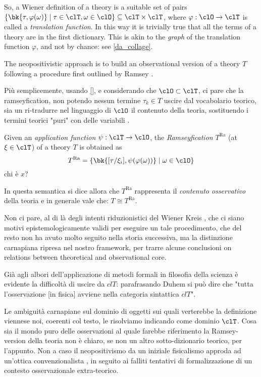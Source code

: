 So, a Wiener definition of a theory is a suitable set of pairs $\{\bk{\tau,\varphi(\omega)} \mid \tau\in\clT, \omega \in\clO\}\subseteq \clT\times\clT$, where $\varphi: \clO \to \clT$ is called a \emph{translation function}. In this way it is trivially true that all the terms of a theory are in the first dictionary. This is akin to the \emph{graph} of the translation function $\varphi$, and not by chance: see \autoref{da_collage}.

The neopositivistic approach is to build an observational version of a theory $T$ following a procedure first outlined by Ramsey \cite{?}.

Più semplicemente, usando \autoref{}, e considerando che $\clO \subset \clT$, ci pare che la ramseyfication, non potendo nessun termine $\tau_k \in T$ uscire dal vocabolario teorico, sia un ri-tradurre nel linguaggio di $\clO$ il contenuto della teoria, sostituendo i termini teorici "puri" con delle variabili \cite{?}.
\begin{definition}
	Given an \emph{application function} $\psi: \clT \to \clO$, the \emph{Ramseyfication} $T^\text{Ra}$ (at $\xi\in\clT$) of a theory $T$ is obtained as  
	\[ 
		T^\text{Ra} = \{\bk{[\tau/\xi_i], \psi(\varphi (\omega))} \mid \omega\in\clO\} 
	\] {\color{red} chi è $x$?}
\end{definition}
In questa semantica si dice allora che $T^\text{Ra}$ rappresenta il \emph{contenuto osservativo} della teoria e in generale vale che: $T \cong T^\text{Ra}$. 



Non ci pare, al di là degli intenti riduzionistici del Wiener Kreis \cite{Weinb}, che ci siano motivi epistemologicamente validi per eseguire un tale procedimento, che del resto non ha avuto molto seguito nella storia successiva, ma la distinzione carnapiana ripresa nel nostro framework, per trarre alcune conclusioni on relations between theoretical and observational core.

Già agli albori dell'applicazione di metodi formali in filosofia della scienza è evidente la difficoltà di uscire da $clT$: parafrasando Duhem si può dire che "tutta l'osservazione [in fisica] avviene nella categoria sintattica $clT$". 

Le ambiguità carnapiane sul dominio di oggetti sui quali verterebbe la definizione viennese noi, coerenti col testo, le risolviamo indicando come dominio $\clT$. Cosa sia il mondo puro delle osservazioni al quale farebbe riferimento la Ramsey-version della teoria non è chiaro, se non un altro sotto-dizionario teorico, per l'appunto. Non a caso il neopositivismo da un iniziale fisicalismo approda ad un'ottica convenzionalista \cite{?}, in seguito ai falliti tentativi di formalizzazione di un contesto osservazionale extra-teorico. 

